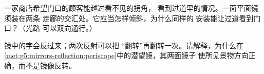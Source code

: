 \begin{exercise}[$\star\star$]\label{exo:g5:mirrors-reflection:10}
一家商店希望门口的顾客能越过看不见的拐角，
看到过道里的情况。一面平面镜须装在两条
走廊的交汇处。它应当怎样倾斜，为什么同样的
安装能让过道看到门口？（光路
可以双向通行。）
\end{exercise}

\begin{exercise}[$\star\star$]\label{exo:g5:mirrors-reflection:11}
镜中的字会反过来；两次反射可以把
“翻转”再翻转一次。请解释，为什么在
\cref{met:g5:mirrors-reflection:periscope}中的潜望镜，其两面镜子
使所见景物方向正确，而不是镜像反转。
\end{exercise}
